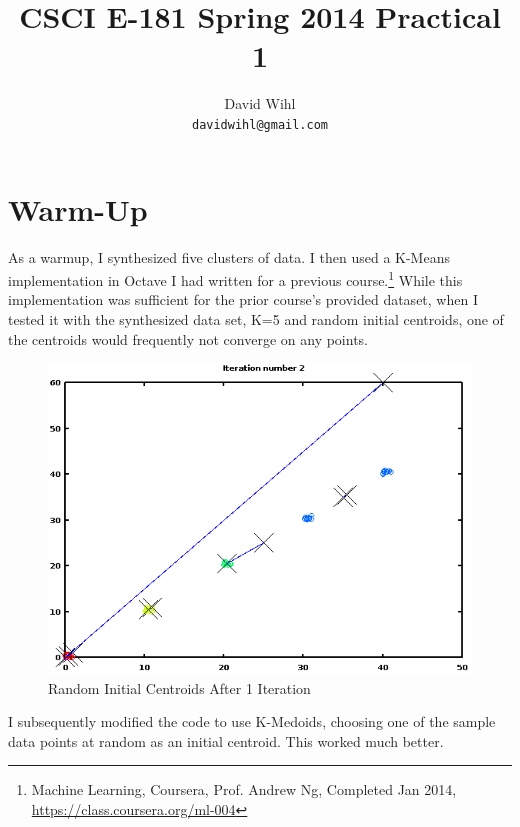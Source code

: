 \documentclass[11pt, oneside]{article}   	%
\title{CSCI E-181 Spring 2014 Practical 1}
\author{David Wihl\\
     \texttt{davidwihl@gmail.com}}
\begin{document}
\maketitle
\section*{Warm-Up}


\par As a warmup, I synthesized five clusters of data.  I then used a K-Means implementation in Octave I had written for a previous course.\footnote{Machine Learning, Coursera, Prof. Andrew Ng, Completed Jan 2014, \url{https://class.coursera.org/ml-004}} While this implementation was sufficient for the prior course's provided dataset, when I tested it with the synthesized data set, K=5 and random initial centroids, one of the centroids would frequently not converge on any points.

\begin{figure}[h!] 
\centering
\includegraphics[scale=0.6]{randominitialClusters}
\caption{Random Initial Centroids After 1 Iteration}
\end{figure}

I subsequently modified the code to use K-Medoids, choosing one of the sample data points at random as an initial centroid. This worked much better.
\end{document}
